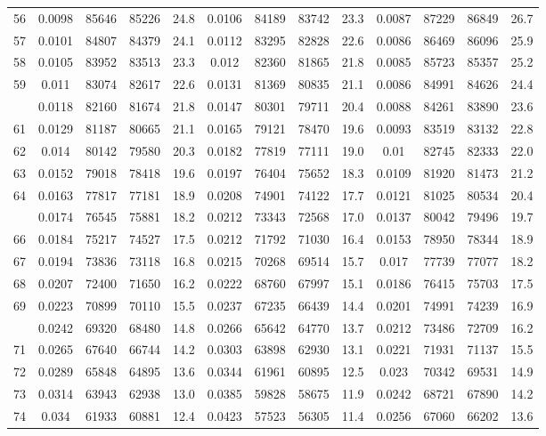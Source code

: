 \documentclass[
  14pt,
]{article}
\begin{document}
\begin{longtable}[t]{lcccccccccccc}
56 & 0.0098 & 85646 & 85226 & 24.8 & 0.0106 & 84189 & 83742 & 23.3 & 0.0087 & 87229 & 86849 & 26.7\\
57 & 0.0101 & 84807 & 84379 & 24.1 & 0.0112 & 83295 & 82828 & 22.6 & 0.0086 & 86469 & 86096 & 25.9\\
58 & 0.0105 & 83952 & 83513 & 23.3 & 0.012 & 82360 & 81865 & 21.8 & 0.0085 & 85723 & 85357 & 25.2\\
59 & 0.011 & 83074 & 82617 & 22.6 & 0.0131 & 81369 & 80835 & 21.1 & 0.0086 & 84991 & 84626 & 24.4\\
\addlinespace
60 & 0.0118 & 82160 & 81674 & 21.8 & 0.0147 & 80301 & 79711 & 20.4 & 0.0088 & 84261 & 83890 & 23.6\\
61 & 0.0129 & 81187 & 80665 & 21.1 & 0.0165 & 79121 & 78470 & 19.6 & 0.0093 & 83519 & 83132 & 22.8\\
62 & 0.014 & 80142 & 79580 & 20.3 & 0.0182 & 77819 & 77111 & 19.0 & 0.01 & 82745 & 82333 & 22.0\\
63 & 0.0152 & 79018 & 78418 & 19.6 & 0.0197 & 76404 & 75652 & 18.3 & 0.0109 & 81920 & 81473 & 21.2\\
64 & 0.0163 & 77817 & 77181 & 18.9 & 0.0208 & 74901 & 74122 & 17.7 & 0.0121 & 81025 & 80534 & 20.4\\
\addlinespace
65 & 0.0174 & 76545 & 75881 & 18.2 & 0.0212 & 73343 & 72568 & 17.0 & 0.0137 & 80042 & 79496 & 19.7\\
66 & 0.0184 & 75217 & 74527 & 17.5 & 0.0212 & 71792 & 71030 & 16.4 & 0.0153 & 78950 & 78344 & 18.9\\
67 & 0.0194 & 73836 & 73118 & 16.8 & 0.0215 & 70268 & 69514 & 15.7 & 0.017 & 77739 & 77077 & 18.2\\
68 & 0.0207 & 72400 & 71650 & 16.2 & 0.0222 & 68760 & 67997 & 15.1 & 0.0186 & 76415 & 75703 & 17.5\\
69 & 0.0223 & 70899 & 70110 & 15.5 & 0.0237 & 67235 & 66439 & 14.4 & 0.0201 & 74991 & 74239 & 16.9\\
\addlinespace
70 & 0.0242 & 69320 & 68480 & 14.8 & 0.0266 & 65642 & 64770 & 13.7 & 0.0212 & 73486 & 72709 & 16.2\\
71 & 0.0265 & 67640 & 66744 & 14.2 & 0.0303 & 63898 & 62930 & 13.1 & 0.0221 & 71931 & 71137 & 15.5\\
72 & 0.0289 & 65848 & 64895 & 13.6 & 0.0344 & 61961 & 60895 & 12.5 & 0.023 & 70342 & 69531 & 14.9\\
73 & 0.0314 & 63943 & 62938 & 13.0 & 0.0385 & 59828 & 58675 & 11.9 & 0.0242 & 68721 & 67890 & 14.2\\
74 & 0.034 & 61933 & 60881 & 12.4 & 0.0423 & 57523 & 56305 & 11.4 & 0.0256 & 67060 & 66202 & 13.6\\

\end{longtable}
\end{document}
